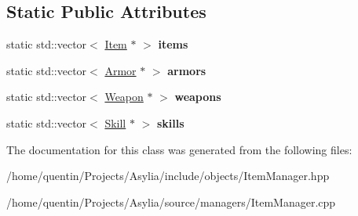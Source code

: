 \subsection*{Static Public Attributes}
\begin{DoxyCompactItemize}
\item 
\hypertarget{classItemManager_aabf6d12187715764bfb451c7e947d472}{static std\-::vector$<$ \hyperlink{classItem}{Item} $\ast$ $>$ {\bfseries items}}\label{classItemManager_aabf6d12187715764bfb451c7e947d472}

\item 
\hypertarget{classItemManager_ad00daeaa0bcfb306ef7ec2fe9fdc3850}{static std\-::vector$<$ \hyperlink{classArmor}{Armor} $\ast$ $>$ {\bfseries armors}}\label{classItemManager_ad00daeaa0bcfb306ef7ec2fe9fdc3850}

\item 
\hypertarget{classItemManager_aa62d65473c44e892eb48aca3d72e634f}{static std\-::vector$<$ \hyperlink{classWeapon}{Weapon} $\ast$ $>$ {\bfseries weapons}}\label{classItemManager_aa62d65473c44e892eb48aca3d72e634f}

\item 
\hypertarget{classItemManager_a20fceaafe023d5d6073f37afe3859cca}{static std\-::vector$<$ \hyperlink{classSkill}{Skill} $\ast$ $>$ {\bfseries skills}}\label{classItemManager_a20fceaafe023d5d6073f37afe3859cca}

\end{DoxyCompactItemize}


The documentation for this class was generated from the following files\-:\begin{DoxyCompactItemize}
\item 
/home/quentin/\-Projects/\-Asylia/include/objects/Item\-Manager.\-hpp\item 
/home/quentin/\-Projects/\-Asylia/source/managers/Item\-Manager.\-cpp\end{DoxyCompactItemize}
